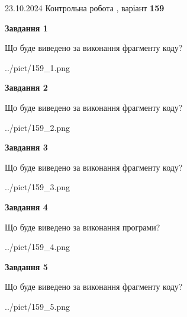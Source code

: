 \documentclass[12pt, ukrainian]{article}
\begin{document}
{\Large{23.10.2024 Контрольна робота , варіант  \No \textbf { 159 }\par}}
{
\begin {large}
{\begin {center}\textbf{Завдання 1}\end {center}}

Що буде виведено за виконання фрагменту коду?\par
\begin{center}
	{../pict/159_1.png}
\end{center}
\newpage

{\begin {center}\textbf{Завдання 2}\end {center}}

Що буде виведено за виконання фрагменту коду?\par
\begin{center}
	{../pict/159_2.png}
\end{center}
\newpage

{\begin {center}\textbf{Завдання 3}\end {center}}

Що буде виведено за виконання фрагменту коду?\par
\begin{center}
	{../pict/159_3.png}
\end{center}
\newpage

{\begin {center}\textbf{Завдання 4}\end {center}}

Що буде виведено за виконання програми?\par
\begin{center}
	{../pict/159_4.png}
\end{center}
\newpage

{\begin {center}\textbf{Завдання 5}\end {center}}

Що буде виведено за виконання фрагменту коду?\par
\begin{center}
	{../pict/159_5.png}
\end{center}
\newpage


\end{large}}
\end{document}
